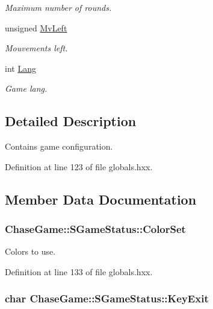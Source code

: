 \begin{DoxyCompactItemize}
\begin{DoxyCompactList}\small\item\em Maximum number of rounds. \end{DoxyCompactList}\item 
unsigned \hyperlink{struct_chase_game_1_1_s_game_status_ae06758bdc7c2bda68801afd314837532}{Mv\-Left}
\begin{DoxyCompactList}\small\item\em Mouvements left. \end{DoxyCompactList}\item 
int \hyperlink{struct_chase_game_1_1_s_game_status_a93c5db2ceb07569075406e865949b4d9}{Lang}
\begin{DoxyCompactList}\small\item\em Game lang. \end{DoxyCompactList}\end{DoxyCompactItemize}


\subsection{Detailed Description}
Contains game configuration. 

Definition at line 123 of file globals.\-hxx.



\subsection{Member Data Documentation}
\hypertarget{struct_chase_game_1_1_s_game_status_adc7431634611868499b650c2dc6a67b6}{
\subsubsection[{Color\-Set}]{ Chase\-Game\-::\-S\-Game\-Status\-::\-Color\-Set}}\label{struct_chase_game_1_1_s_game_status_adc7431634611868499b650c2dc6a67b6}


Colors to use. 



Definition at line 133 of file globals.\-hxx.

\hypertarget{struct_chase_game_1_1_s_game_status_a6a88e0903d13f10f4fcf8050157b2bdb}{
\subsubsection[{Key\-Exit}]{\setlength{\rightskip}{0pt plus 5cm}char Chase\-Game\-::\-S\-Game\-Status\-::\-Key\-Exit}}\label{struct_chase_game_1_1_s_game_status_a6a88e0903d13f10f4fcf8050157b2bdb}


